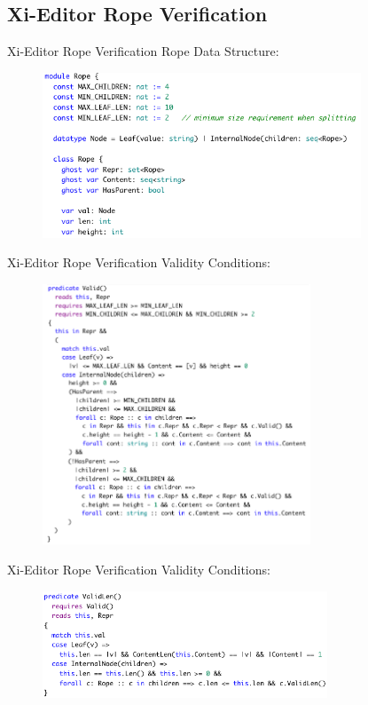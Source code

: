 \documentclass{beamer}
\begin{document}
\subsection{Xi-Editor Rope Verification}

\begin{frame}{Xi-Editor Rope Verification}
  Rope Data Structure:

  \begin{figure}
      \includegraphics[width=9.5cm]{images/xi-rope-datastructure.png}
  \end{figure}
\end{frame}

\begin{frame}{Xi-Editor Rope Verification}
  Validity Conditions:

  \begin{figure}
      \includegraphics[width=8cm]{images/xi-rope-valid.png}
  \end{figure}

\end{frame}

\begin{frame}{Xi-Editor Rope Verification}
  Validity Conditions:

  \begin{figure}
      \centering
      \includegraphics[width=8.5cm]{images/xi-rope-valid-len.png}
  \end{figure}
\end{frame}
\end{document}
